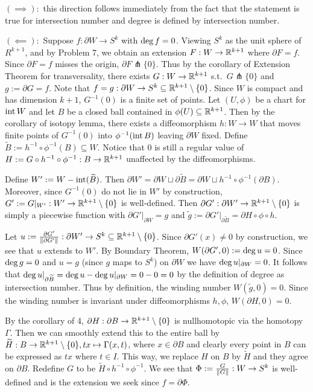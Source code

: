 \documentclass[12pt]{article}
\begin{document}
\begin{problem}[3.6.8]
$ (\implies):$ this direction follows immediately from the fact that the statement is true for intersection number and degree is defined by intersection number.

$ (\impliedby):$ Suppose $ f: \partial W \to S^{k}$ with $ \operatorname{deg} f = 0$. Viewing $ S^{k}$ as the unit sphere of $ R^{k+1}$, and by Problem 7, we obtain an extension $ F: W \to \mathbb{R}^{k+1}$ where $ \partial F = f$. Since $ \partial F=f$ misses the origin, $ \partial F  \pitchfork \{0\}$. Thus by the corollary of Extension Theorem for transversality, there exists $ G: W \to \mathbb{R}^{k+1}$ s.t.\ $ G \pitchfork \{0\} $ and $g:= \partial G = f$. Note that $ f=g: \partial W \to S^{k} \subseteq  \mathbb{R}^{k+1} \setminus \{0\}$. Since $ W$ is compact and has dimension  $ k+1$,  $ G^{-1}(0)$ is a finite set of points. Let $ (U,\phi)$ be a chart for $ \operatorname{int} W$ and let $ B$ be a closed ball contained in  $ \phi(U) \subseteq \mathbb{R}^{k+1}$. Then by the corollary of isotopy lemma, there exists a diffeomorphism $ h: W \to W$ that moves finite points of $ G^{-1}(0)$ into $\phi ^{-1}(\operatorname{int} B)$ leaving $ \partial W$ fixed. Define $ \widetilde{ B} := h^{-1} \circ \phi ^{-1}(B) \subseteq W$. Notice that $ 0$ is still a regular value of $H:=G \circ h^{-1} \circ \phi ^{-1}: B \to \mathbb{R}^{k+1}$ unaffected by the diffeomorphisms. 

Define $ W' := W - \operatorname{int} (\widetilde{ B})$. Then $ \partial W' = \partial W \sqcup  \partial \widetilde{ B} = \partial W \sqcup  h^{-1} \circ \phi ^{-1}(\partial B)$. Moreover, since $ G^{-1}(0)$ do not lie in $ W'$ by construction, $ G':=G|_{W'}: W' \to \mathbb{R}^{k+1}\setminus  \{0\} $ is well-defined. Then $ \partial G': \partial W' \to \mathbb{R}^{k+1} \setminus \{0\} $ is simply a piecewise function with $\partial G'|_{\partial W} = g$ and $ \widetilde{ g}:= \partial G'|_{\partial \widetilde{ B}} =\partial H \circ \phi \circ h$. 

Let $ u:= \frac{\partial G'}{ {\left\lVert{ \partial G'}\right\rVert} }: \partial W' \to S^{k} \subseteq  \mathbb{R}^{k+1} \setminus \{0\} $. Since $ \partial G'(x) \neq 0$ by construction, we see that $ u$ extends to  $ W'$. By Boundary Theorem, $W(\partial G',0):= \operatorname{deg} u = 0$. Since $ \operatorname{deg} g=0$ and $ u = g$ (since $ g$ maps to  $ S^{k}$) on $ \partial W$ we have $ \operatorname{deg} u|_{ \partial W} = 0$. It follows that $ \operatorname{deg} u|_{ \partial \widetilde{ B}} = \operatorname{deg} u - \operatorname{deg} u|_{\partial W} = 0-0=0$ by the definition of degree as intersection number. Thus by definition, the winding number $ W(\widetilde{ g},0) = 0$. Since the winding number is invariant under diffeomorphisms $ h,\phi$, $ W(\partial H,0)=0$.

By the corollary of 4, $ \partial H: \partial B \to \mathbb{R}^{k+1} \setminus \{0\} $ is nullhomotopic via the homotopy $ \Gamma$. Then we can smoothly extend this to the entire ball by $\widetilde{ H}: B \to \mathbb{R}^{k+1} \setminus \{0\} , tx\mapsto \Gamma(x,t)$, where $ x \in \partial B$ and clearly every point in $ B$ can be expressed as $ tx$ where $ t \in I$. This way, we replace $ H$ on  $ B$ by $ \widetilde{ H}$ and they agree on $ \partial B$. Redefine $ G$ to be  $ \widetilde{ H} \circ h^{-1} \circ \phi ^{-1}$. We see that $ \Phi:=\frac{G}{{\left\lVert{ G}\right\rVert} }: W \to S^{k}$ is well-defined and is the extension we seek since $ f = \partial \Phi$.
\end{problem}
\end{document}
